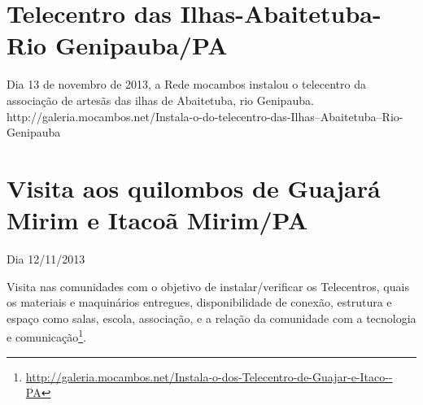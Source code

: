 \documentclass[a4paper, 11pt, oneside]{Relatorio_sem}  %
\begin{document}
\section{Telecentro das Ilhas-Abaitetuba-Rio Genipauba/PA}

Dia 13 de novembro de 2013, a Rede mocambos instalou o telecentro da
associação de artesãs das ilhas de Abaitetuba, rio Genipauba.
http://galeria.mocambos.net/Instala-o-do-telecentro-das-Ilhas--Abaitetuba--Rio-Genipauba


\section{Visita aos quilombos de Guajará Mirim e Itacoã Mirim/PA}
Dia 12/11/2013 

Visita nas comunidades com o objetivo de instalar/verificar os
Telecentros, quais os materiais e maquinários entregues,
disponibilidade de conexão, estrutura e espaço como salas, escola,
associação, e a relação da comunidade com a tecnologia e
comunicação\footnote{\url{http://galeria.mocambos.net/Instala-o-dos-Telecentro-de-Guajar-e-Itaco--PA}}.
\end{document}
